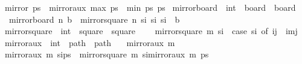 \begin{isabellebody}
\isanewline
{}\isamarkupfalse%
\ {\isachardoublequoteopen}mirror{}\ ps\ {\isacharequal}{\kern0pt}\ mirror{}{\isacharunderscore}{\kern0pt}aux\ {\isacharparenleft}{\kern0pt}max{}\ ps\ {\isacharplus}{\kern0pt}\ min{}\ ps{\isacharparenright}{\kern0pt}\ ps{\isachardoublequoteclose}\isanewline
\isanewline
{}\isamarkupfalse%
\ mirror{}{\isacharunderscore}{\kern0pt}board\ {\isacharcolon}{\kern0pt}{\isacharcolon}{\kern0pt}\ {\isachardoublequoteopen}int\ {\isasymRightarrow}\ board\ {\isasymRightarrow}\ board{\isachardoublequoteclose}\ \isanewline
\ \ {\isachardoublequoteopen}mirror{}{\isacharunderscore}{\kern0pt}board\ n\ b\ {\isasymequiv}\ {\isacharbraceleft}{\kern0pt}mirror{}{\isacharunderscore}{\kern0pt}square\ n\ s\isactrlsub i\ {\isacharbar}{\kern0pt}s\isactrlsub i{\isachardot}{\kern0pt}\ s\isactrlsub i\ {\isasymin}\ b{\isacharbraceright}{\kern0pt}{\isachardoublequoteclose}\isanewline
\isanewline
{}\isamarkupfalse%
\ mirror{}{\isacharunderscore}{\kern0pt}square\ {\isacharcolon}{\kern0pt}{\isacharcolon}{\kern0pt}\ {\isachardoublequoteopen}int\ {\isasymRightarrow}\ square\ {\isasymRightarrow}\ square{\isachardoublequoteclose}\ \ \isanewline
\ \ {\isachardoublequoteopen}mirror{}{\isacharunderscore}{\kern0pt}square\ m\ s\isactrlsub i\ {\isacharequal}{\kern0pt}\ {\isacharparenleft}{\kern0pt}case\ s\isactrlsub i\ of\ {\isacharparenleft}{\kern0pt}i{\isacharcomma}{\kern0pt}j{\isacharparenright}{\kern0pt}\ {\isasymRightarrow}\ {\isacharparenleft}{\kern0pt}i{\isacharcomma}{\kern0pt}m{\isacharminus}{\kern0pt}j{\isacharparenright}{\kern0pt}{\isacharparenright}{\kern0pt}{\isachardoublequoteclose}\isanewline
\isanewline
{}\isamarkupfalse%
\ mirror{}{\isacharunderscore}{\kern0pt}aux\ {\isacharcolon}{\kern0pt}{\isacharcolon}{\kern0pt}\ {\isachardoublequoteopen}int\ {\isasymRightarrow}\ path\ {\isasymRightarrow}\ path{\isachardoublequoteclose}\ \isanewline
\ \ {\isachardoublequoteopen}mirror{}{\isacharunderscore}{\kern0pt}aux\ m\ {\isacharbrackleft}{\kern0pt}{\isacharbrackright}{\kern0pt}\ {\isacharequal}{\kern0pt}\ {\isacharbrackleft}{\kern0pt}{\isacharbrackright}{\kern0pt}{\isachardoublequoteclose}\isanewline
{\isacharbar}{\kern0pt}\ {\isachardoublequoteopen}mirror{}{\isacharunderscore}{\kern0pt}aux\ m\ {\isacharparenleft}{\kern0pt}s\isactrlsub i{\isacharhash}{\kern0pt}ps{\isacharparenright}{\kern0pt}\ {\isacharequal}{\kern0pt}\ {\isacharparenleft}{\kern0pt}mirror{}{\isacharunderscore}{\kern0pt}square\ m\ s\isactrlsub i{\isacharparenright}{\kern0pt}{\isacharhash}{\kern0pt}mirror{}{\isacharunderscore}{\kern0pt}aux\ m\ ps{\isachardoublequoteclose}\isanewline

\end{isabellebody}
